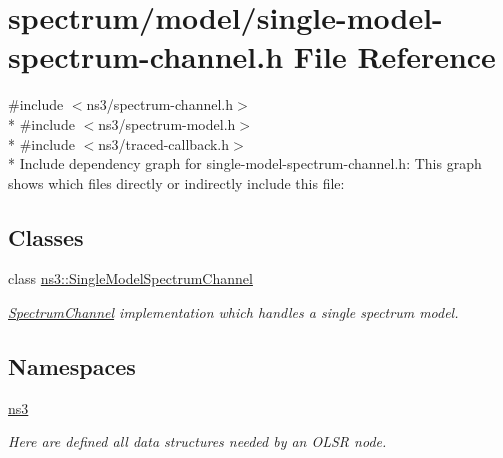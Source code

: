 \hypertarget{single-model-spectrum-channel_8h}{}\section{spectrum/model/single-\/model-\/spectrum-\/channel.h File Reference}
\label{single-model-spectrum-channel_8h}
{\ttfamily \#include $<$ns3/spectrum-\/channel.\+h$>$}\\*
{\ttfamily \#include $<$ns3/spectrum-\/model.\+h$>$}\\*
{\ttfamily \#include $<$ns3/traced-\/callback.\+h$>$}\\*
Include dependency graph for single-\/model-\/spectrum-\/channel.h\+:
This graph shows which files directly or indirectly include this file\+:
\subsection*{Classes}
\begin{DoxyCompactItemize}
\item 
class \hyperlink{classns3_1_1SingleModelSpectrumChannel}{ns3\+::\+Single\+Model\+Spectrum\+Channel}
\begin{DoxyCompactList}\small\item\em \hyperlink{classns3_1_1SpectrumChannel}{Spectrum\+Channel} implementation which handles a single spectrum model. \end{DoxyCompactList}\end{DoxyCompactItemize}
\subsection*{Namespaces}
\begin{DoxyCompactItemize}
\item 
 \hyperlink{namespacens3}{ns3}
\begin{DoxyCompactList}\small\item\em Here are defined all data structures needed by an O\+L\+SR node. \end{DoxyCompactList}\end{DoxyCompactItemize}
